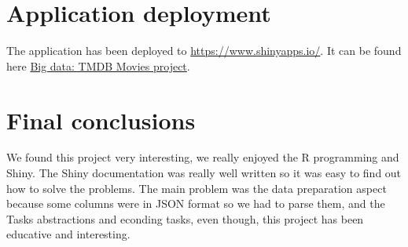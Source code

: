 \section{Application deployment}

The application has been deployed to \url{https://www.shinyapps.io/}. It can be found here \href{https://jruedas.shinyapps.io/movies/}{Big data: TMDB Movies project}.

\section{Final conclusions}

We found this project very interesting, we really enjoyed the R programming and Shiny. The Shiny documentation was really well written so it was easy to find out how to solve the problems. The main problem was the data preparation aspect because some columns were in JSON format so we had to parse them, and the Tasks abstractions and econding tasks, even though, this project has been educative and interesting.\\

